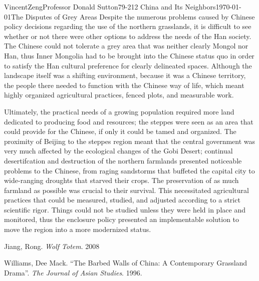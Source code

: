 \documentclass{article}[12pt]
\begin{document}
\begin{mla}{Vincent}{Zeng}{Professor Donald Sutton}{79-212 China and Its Neighbors}{\today}{The Disputes of Grey Areas}
	Despite the numerous problems caused by Chinese policy decisions
	regarding the use of the northern grasslands, it is difficult to see whether or
	not there were other options to address the needs of the Han society. The
	Chinese could not tolerate a grey area that was neither clearly Mongol nor Han,
	thus Inner Mongolia had to be brought into the Chinese status quo
	in order to satisfy the Han cultural preference for clearly delineated spaces. Although
	the landscape itself was a shifting environment, because it was a
	Chinese territory, the people there needed to function with the Chinese
	way of life, which meant highly organized agricultural practices, fenced plots, and measurable work.
	
	Ultimately, the practical needs of a growing population required more
	land dedicated to producing food and
	resources; the steppes were seen as an area that could provide for the
	Chinese, if only it could be tamed and organized. The proximity of
	Beijing to the steppes region meant that the central government was very
	much affected by the ecological changes of the Gobi Desert; continual
	desertifcation and destruction of the northern farmlands presented
	noticeable problems to the Chinese, from raging sandstorms that
	buffeted the capital city to wide-ranging droughts that starved their
	crops. The preservation of as much farmland as possible was crucial to
	their survival. This necessitated agricultural
	practices that could be measured, studied, and adjusted according to a
	strict scientific rigor. Things could not be studied unless they were
	held in place and monitored, thus the enclosure policy presented an
	implementable solution to move the region into a more modernized status.

\begin{workscited}

	\bibent
	Jiang, Rong. \textit{Wolf Totem}. 2008

	\bibent
	Williams, Dee Mack. ``The Barbed Walls of China: A Contemporary Grassland Drama''. \textit{The Journal of Asian Studies}. 1996.
\end{workscited}
\end{mla}
\end{document}
